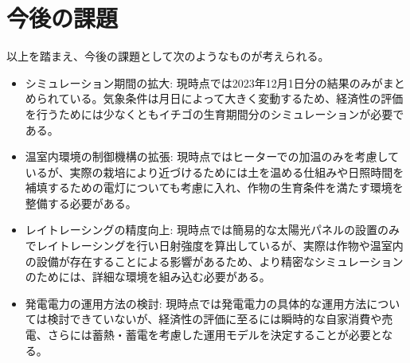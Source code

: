 \documentclass[uplatex,dvipdfmx,nomag,a4paper,oneside,onecolumn,12pt]{bxjsreport} %
\begin{document}
\section{今後の課題}
以上を踏まえ、今後の課題として次のようなものが考えられる。
\begin{itemize}
    \item シミュレーション期間の拡大: 現時点では2023年12月1日分の結果のみがまとめられている。気象条件は月日によって大きく変動するため、経済性の評価を行うためには少なくともイチゴの生育期間分のシミュレーションが必要である。
    \item 温室内環境の制御機構の拡張: 現時点ではヒーターでの加温のみを考慮しているが、実際の栽培により近づけるためには土を温める仕組みや日照時間を補填するための電灯についても考慮に入れ、作物の生育条件を満たす環境を整備する必要がある。
    \item レイトレーシングの精度向上: 現時点では簡易的な太陽光パネルの設置のみでレイトレーシングを行い日射強度を算出しているが、実際は作物や温室内の設備が存在することによる影響があるため、より精密なシミュレーションのためには、詳細な環境を組み込む必要がある。
    \item 発電電力の運用方法の検討: 現時点では発電電力の具体的な運用方法については検討できていないが、経済性の評価に至るには瞬時的な自家消費や売電、さらには蓄熱・蓄電を考慮した運用モデルを決定することが必要となる。
\end{itemize}
\end{document}

